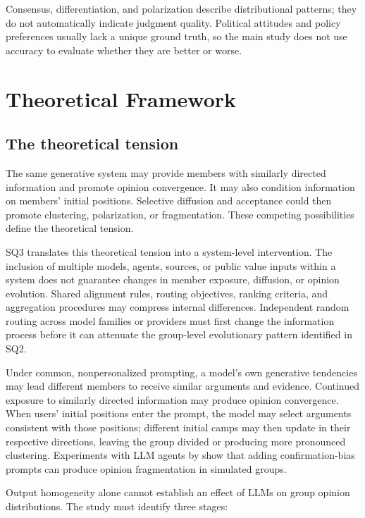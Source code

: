 \documentclass[11pt,a4paper]{article}
\begin{document}
Consensus, differentiation, and polarization describe distributional patterns; they do not automatically indicate judgment quality. Political attitudes and policy preferences usually lack a unique ground truth, so the main study does not use accuracy to evaluate whether they are better or worse.

\section{Theoretical Framework}

\subsection{The theoretical tension}

The same generative system may provide members with similarly directed information and promote opinion convergence. It may also condition information on members' initial positions. Selective diffusion and acceptance could then promote clustering, polarization, or fragmentation. These competing possibilities define the theoretical tension.

SQ3 translates this theoretical tension into a system-level intervention. The inclusion of multiple models, agents, sources, or public value inputs within a system does not guarantee changes in member exposure, diffusion, or opinion evolution. Shared alignment rules, routing objectives, ranking criteria, and aggregation procedures may compress internal differences. Independent random routing across model families or providers must first change the information process before it can attenuate the group-level evolutionary pattern identified in SQ2.

Under common, nonpersonalized prompting, a model's own generative tendencies may lead different members to receive similar arguments and evidence. Continued exposure to similarly directed information may produce opinion convergence. When users' initial positions enter the prompt, the model may select arguments consistent with those positions; different initial camps may then update in their respective directions, leaving the group divided or producing more pronounced clustering. Experiments with LLM agents by \citet{chuang2024} show that adding confirmation-bias prompts can produce opinion fragmentation in simulated groups.

Output homogeneity alone cannot establish an effect of LLMs on group opinion distributions. The study must identify three stages:
\end{document}
